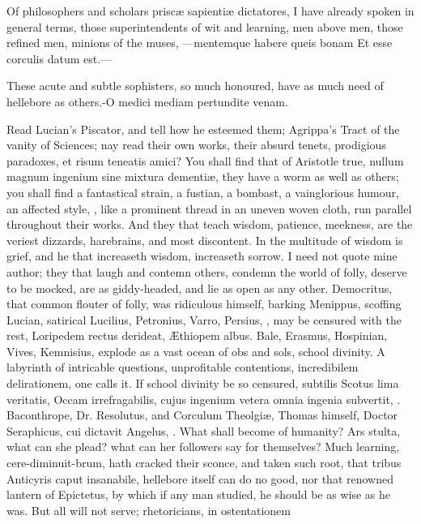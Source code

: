 {Of philosophers and scholars prisc\ae{} sapienti\ae{} dictatores, I have
already spoken in general terms, those superintendents of wit and
learning, men above men, those refined men, minions of the muses,
---mentemque habere queis bonam
Et esse corculis datum est.---

These acute and subtle sophisters, so much honoured, have as much
need of hellebore as others.-O medici mediam pertundite venam.

Read Lucian's Piscator, and tell how he esteemed them; Agrippa's Tract
of the vanity of Sciences; nay read their own works, their absurd
tenets, prodigious paradoxes, et risum teneatis amici? You shall find
that of Aristotle true, nullum magnum ingenium sine mixtura dementi\ae{},
they have a worm as well as others; you shall find a fantastical
strain, a fustian, a bombast, a vainglorious humour, an affected style,
\etc{}, like a prominent thread in an uneven woven cloth, run parallel
throughout their works. And they that teach wisdom, patience, meekness,
are the veriest dizzards, harebrains, and most discontent. In the
multitude of wisdom is grief, and he that increaseth wisdom, increaseth
sorrow. I need not quote mine author; they that laugh and contemn
others, condemn the world of folly, deserve to be mocked, are as
giddy-headed, and lie as open as any other. Democritus, that
common flouter of folly, was ridiculous himself, barking Menippus,
scoffing Lucian, satirical Lucilius, Petronius, Varro, Persius, \etc{},
may be censured with the rest, Loripedem rectus derideat, \AE{}thiopem
albus. Bale, Erasmus, Hospinian, Vives, Kemnisius, explode as a vast
ocean of obs and sols, school divinity. A labyrinth of intricable
questions, unprofitable contentions, incredibilem delirationem, one
calls it. If school divinity be so censured, subtilis Scotus lima
veritatis, Occam irrefragabilis, cujus ingenium vetera omnia ingenia
subvertit, \etc{}. Baconthrope, Dr. Resolutus, and Corculum Theolgi\ae{},
Thomas himself, Doctor Seraphicus, cui dictavit Angelus, \etc{}. What
shall become of humanity? Ars stulta, what can she plead? what can her
followers say for themselves? Much learning,  cere-diminuit-brum,
hath cracked their sconce, and taken such root, that tribus Anticyris
caput insanabile, hellebore itself can do no good, nor that renowned
lantern of Epictetus, by which if any man studied, he should be as
wise as he was. But all will not serve; rhetoricians, in ostentationem
}
